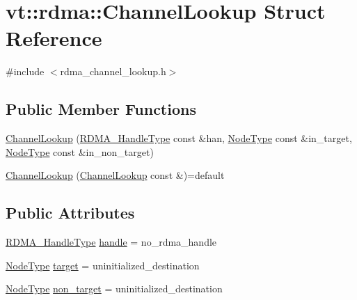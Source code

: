 \hypertarget{structvt_1_1rdma_1_1_channel_lookup}{}\section{vt\+:\+:rdma\+:\+:Channel\+Lookup Struct Reference}
\label{structvt_1_1rdma_1_1_channel_lookup}


{\ttfamily \#include $<$rdma\+\_\+channel\+\_\+lookup.\+h$>$}

\subsection*{Public Member Functions}
\begin{DoxyCompactItemize}
\item 
\hyperlink{structvt_1_1rdma_1_1_channel_lookup_a6e438b399a526542f97ef6cbf96a7378}{Channel\+Lookup} (\hyperlink{namespacevt_a10442579ec4e7ebef223818e64bcf908}{R\+D\+M\+A\+\_\+\+Handle\+Type} const \&han, \hyperlink{namespacevt_a866da9d0efc19c0a1ce79e9e492f47e2}{Node\+Type} const \&in\+\_\+target, \hyperlink{namespacevt_a866da9d0efc19c0a1ce79e9e492f47e2}{Node\+Type} const \&in\+\_\+non\+\_\+target)
\item 
\hyperlink{structvt_1_1rdma_1_1_channel_lookup_af5ffd2e82bd5972d35f03be34279e4d6}{Channel\+Lookup} (\hyperlink{structvt_1_1rdma_1_1_channel_lookup}{Channel\+Lookup} const \&)=default
\end{DoxyCompactItemize}
\subsection*{Public Attributes}
\begin{DoxyCompactItemize}
\item 
\hyperlink{namespacevt_a10442579ec4e7ebef223818e64bcf908}{R\+D\+M\+A\+\_\+\+Handle\+Type} \hyperlink{structvt_1_1rdma_1_1_channel_lookup_a02cd23701c295b73675c998d4e84c4b9}{handle} = no\+\_\+rdma\+\_\+handle
\item 
\hyperlink{namespacevt_a866da9d0efc19c0a1ce79e9e492f47e2}{Node\+Type} \hyperlink{structvt_1_1rdma_1_1_channel_lookup_a5fc6e66edbe73653e261246202d22b97}{target} = uninitialized\+\_\+destination
\item 
\hyperlink{namespacevt_a866da9d0efc19c0a1ce79e9e492f47e2}{Node\+Type} \hyperlink{structvt_1_1rdma_1_1_channel_lookup_ae01c924a3a559f70dfda62b187989f51}{non\+\_\+target} = uninitialized\+\_\+destination
\end{DoxyCompactItemize}


